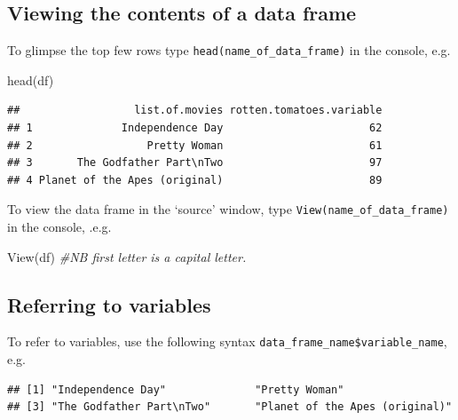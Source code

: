 \documentclass[]{article}
\newenvironment{Shaded}{\begin{snugshade}}{\end{snugshade}}
\newcommand{\CommentTok}[1]{\textcolor[rgb]{0.56,0.35,0.01}{\textit{#1}}}
\newcommand{\FunctionTok}[1]{\textcolor[rgb]{0.00,0.00,0.00}{#1}}
\newcommand{\NormalTok}[1]{#1}
\newcommand{\SpecialCharTok}[1]{\textcolor[rgb]{0.00,0.00,0.00}{#1}}
\begin{document}
\hypertarget{viewing-the-contents-of-a-data-frame}{%
\subsection{Viewing the contents of a data
frame}\label{viewing-the-contents-of-a-data-frame}}

To glimpse the top few rows type \texttt{head(name\_of\_data\_frame)} in
the console, e.g.

\begin{Shaded}
\begin{Highlighting}[]
\FunctionTok{head}\NormalTok{(df)}
\end{Highlighting}
\end{Shaded}

\begin{verbatim}
##                  list.of.movies rotten.tomatoes.variable
## 1              Independence Day                       62
## 2                  Pretty Woman                       61
## 3       The Godfather Part\nTwo                       97
## 4 Planet of the Apes (original)                       89
\end{verbatim}

To view the data frame in the `source' window, type
\texttt{View(name\_of\_data\_frame)} in the console, .e.g.

\begin{Shaded}
\begin{Highlighting}[]
\FunctionTok{View}\NormalTok{(df) }\CommentTok{\#NB first letter is a capital letter.}
\end{Highlighting}
\end{Shaded}

\hypertarget{referring-to-variables}{%
\subsection{Referring to variables}\label{referring-to-variables}}

To refer to variables, use the following syntax
\texttt{data\_frame\_name\$variable\_name}, e.g.

\begin{Shaded}
\end{Shaded}

\begin{verbatim}
## [1] "Independence Day"              "Pretty Woman"                 
## [3] "The Godfather Part\nTwo"       "Planet of the Apes (original)"
\end{verbatim}
\end{document}
